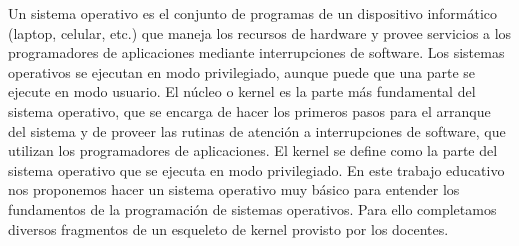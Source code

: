 Un sistema operativo es el conjunto de programas de un dispositivo informático (laptop, celular, etc.) que maneja los recursos de hardware y provee servicios a los programadores de aplicaciones mediante interrupciones de software. Los sistemas operativos se ejecutan en modo privilegiado, aunque puede que una parte se ejecute en modo usuario.\newline
El núcleo o kernel es la parte más fundamental del sistema operativo, que se encarga de hacer los primeros pasos para el arranque del sistema y de proveer las rutinas de atención a interrupciones de software, que utilizan los programadores de aplicaciones.\newline
El kernel se define como la parte del sistema operativo que se ejecuta en modo privilegiado.​\newline
En este trabajo educativo nos proponemos hacer un sistema operativo muy básico para entender los fundamentos de la programación de sistemas operativos.\newline
Para ello completamos diversos fragmentos de un esqueleto de kernel provisto por los docentes. 
